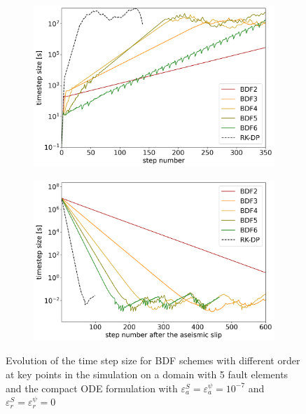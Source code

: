 \begin{figure}[H]
	\centering
	\begin{subfigure}{0.45\textwidth}
		\centering
		\includegraphics[width=1\textwidth]{images/TANDEMTimeAnalysisDifferentBDFOrdersLagrange_CompactODE_Size5_Init.png}
		\label{fig:BDFOrders_compact_ODE_compare_initialization}
	\end{subfigure}
	\begin{subfigure}{0.45\textwidth}
		\centering
		\includegraphics[width=1\textwidth]{images/TANDEMTimeAnalysisDifferentBDFOrdersLagrange_CompactODE_Size5_Begin1stEQ.png}
		\label{fig:BDFOrders_compact_ODE_compare_begin_first_EQ}
	\end{subfigure}
	\caption{Evolution of the time step size for BDF schemes with different order at key points in the simulation on a domain with 5 fault elements and the compact ODE formulation with $\varepsilon^S_a = \varepsilon^{\psi}_a = 10^{-7}$ and $\varepsilon^S_r = \varepsilon^{\psi}_r = 0$ }
\end{figure}
